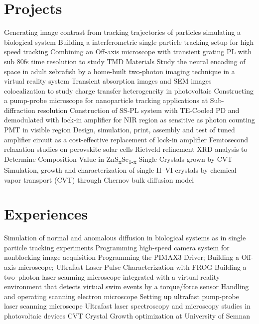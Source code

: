 \documentclass[11pt,a4paper]{moderncv}
\begin{document}
\section{Projects}
        {Generating image contrast from tracking trajectories of particles 
        simulating a biological system}
        {Building a interferometric single particle tracking setup 
        for high speed tracking}
        {Combining an Off-axis microscope with 
        transient grating PL with sub 80fs time resolution 
        to study TMD Materials}
        {Study the neural encoding of space in adult zebrafish 
        by a home-built two-photon 
        imaging technique in a virtual reality system}
        {Transient absorption images and SEM images colocalization 
        to study charge transfer heterogeneity in photovoltaic}
        {Constructing a pump-probe microscope for nanoparticle tracking 
        applications at Sub-diffraction resolution}
        {Construction of SS-PL system with TE-Cooled PD 
        and demodulated with lock-in amplifier for NIR region as 
        sensitive as photon counting PMT in visible region}
        {Design, simulation, print, assembly and test 
        of tuned amplifier circuit as a cost-effective replacement 
        of lock-in amplifier}
        {Femtosecond relaxation studies on perovskite solar cells}
        {Rietveld refinement XRD analysis to 
        Determine Composition Value in ZnS\textsubscript{x}Se\textsubscript{1-x} 
        Single Crystals grown by CVT}
        {Simulation, growth and characterization 
        of single II--VI crystals 
        by chemical vapor transport (CVT) through Chernov bulk diffusion model}
\section{Experiences}
        {Simulation of normal and anomalous diffusion in biological systems 
        as in single particle tracking experiments}
        {Programming high-speed camera system for nonblocking 
        image acquisition}
        {Programming the PIMAX3 Driver; Building a Off-axis microscope; 
        Ultrafast Laser Pulse Characterization with FROG}
        {Building a two--photon laser scanning microscope 
        integrated with a virtual reality environment 
        that detects virtual swim events by a torque/force sensor}
        {Handling and operating scanning electron microscope}
        {Setting up ultrafast pump-probe laser scanning microscope}
        {Ultrafast laser spectroscopy and microscopy
    studies in photovoltaic devices}
        {CVT Crystal Growth optimization at University of Semnan}
\end{document}
